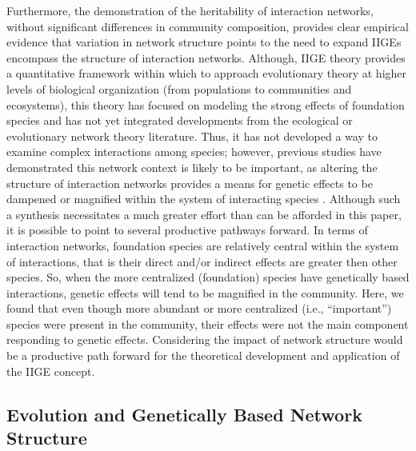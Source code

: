 \documentclass[fleqn,12pt]{olplainarticle}
\begin{document}
Furthermore, the demonstration of the heritability of interaction
networks, without significant differences in community composition,
provides clear empirical evidence that variation in network structure
points to the need to expand IIGEs encompass the structure of
interaction networks. Although, IIGE theory provides a quantitative
framework within which to approach evolutionary theory at higher
levels of biological organization (from populations to communities and
ecosystems), this theory has focused on modeling the strong effects of
foundation species \citep{Shuster2006COMMUNITYSTRUCTURE, Whitham2012,
  Whitham2020IntraspecificEvolution} and has not yet integrated
developments from the ecological or evolutionary network theory
literature. Thus, it has not developed a way to examine complex
interactions among species; however, previous studies have
demonstrated this network context is likely to be important, as
altering the structure of interaction networks provides a means for
genetic effects to be dampened or magnified within the system of
interacting species \cite{Smith2011, Keith2017}. Although such a
synthesis necessitates a much greater effort than can be afforded in
this paper, it is possible to point to several productive pathways
forward. In terms of interaction networks, foundation species are
relatively central within the system of interactions, that is their
direct and/or indirect effects are greater then other species. So,
when the more centralized (foundation) species have genetically based
interactions, genetic effects will tend to be magnified in the
community. Here, we found that even though more abundant or more
centralized (i.e., ``important'') species were present in the
community, their effects were not the main component responding to
genetic effects. Considering the impact of network structure would be
a productive path forward for the theoretical development and
application of the IIGE concept.


\subsection*{Evolution and Genetically Based Network Structure}
\end{document}
